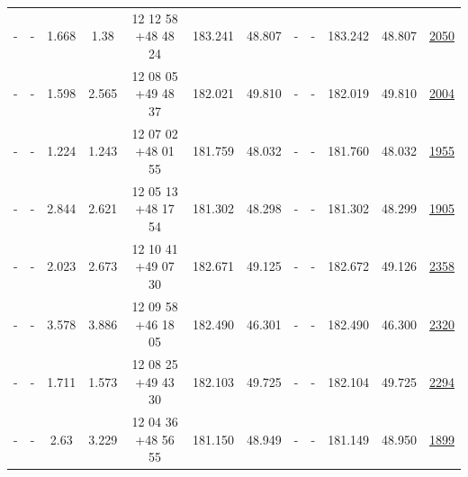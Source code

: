 \documentclass{article}
\begin{document}
\begin{landscape}
\begin{longtable}{c|c|c|c|c|c|c|c|c|c|c|c}
- & - & 1.668 & 1.38 & 12 12 58 +48 48 24 &  183.241 & 48.807 &  - & - & 183.242 & 48.807 & \href{http://banana.transientskp.org/r4/vlo_KmeulenTrap4P23/runningcatalog/2050}{2050}  \\
- & - & 1.598 & 2.565 & 12 08 05 +49 48 37 &  182.021 & 49.810 &  - & - & 182.019 & 49.810 & \href{http://banana.transientskp.org/r4/vlo_KmeulenTrap4P23/runningcatalog/2004}{2004}  \\
- & - & 1.224 & 1.243 & 12 07 02 +48 01 55 &  181.759 & 48.032 &  - & - & 181.760 & 48.032 & \href{http://banana.transientskp.org/r4/vlo_KmeulenTrap4P23/runningcatalog/1955}{1955}  \\
- & - & 2.844 & 2.621 & 12 05 13 +48 17 54 &  181.302 & 48.298 &  - & - & 181.302 & 48.299 & \href{http://banana.transientskp.org/r4/vlo_KmeulenTrap4P23/runningcatalog/1905}{1905}  \\
- & - & 2.023 & 2.673 & 12 10 41 +49 07 30 &  182.671 & 49.125 &  - & - & 182.672 & 49.126 & \href{http://banana.transientskp.org/r4/vlo_KmeulenTrap4P23/runningcatalog/2358}{2358}  \\
- & - & 3.578 & 3.886 & 12 09 58 +46 18 05 &  182.490 & 46.301 &  - & - & 182.490 & 46.300 & \href{http://banana.transientskp.org/r4/vlo_KmeulenTrap4P23/runningcatalog/2320}{2320}  \\
- & - & 1.711 & 1.573 & 12 08 25 +49 43 30 &  182.103 & 49.725 &  - & - & 182.104 & 49.725 & \href{http://banana.transientskp.org/r4/vlo_KmeulenTrap4P23/runningcatalog/2294}{2294}  \\
- & - & 2.63 & 3.229 & 12 04 36 +48 56 55 &  181.150 & 48.949 &  - & - & 181.149 & 48.950 & \href{http://banana.transientskp.org/r4/vlo_KmeulenTrap4P23/runningcatalog/1899}{1899}  \\
\end{longtable}

\end{landscape}
\end{document}
